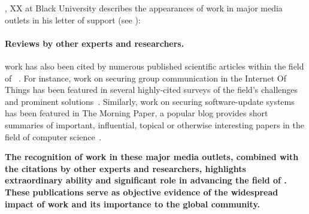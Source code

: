 \aaa, XX at Black University
describes the appearances of \drs work in major media outlets in
his letter of support (see \cite{letter-aaa}):


\paragraph{Reviews by other experts and researchers.}
\drs work has also been cited by numerous published scientific articles
within the field of \dpcs~\cite[Google Scholar profile of \dr]{gscholar}.
For instance, \drs work on securing group communication in the Internet Of
Things has been featured in several highly-cited surveys of the field's
challenges and prominent solutions~\cite[Publications that review \drs
work]{media}.
Similarly, \drs work on securing software-update systems has been featured
in The Morning Paper, a popular blog provides short summaries of important, 
influential, topical or otherwise interesting papers in the field of computer 
science~\cite{media}.

\textbf{The recognition of \drs work in these major media outlets, combined 
with the citations by other experts and researchers, highlights \drs 
extraordinary ability and significant role in advancing the field of \dpcs. 
These publications serve as objective evidence of the widespread impact of \drs 
work and its importance to the global community.}